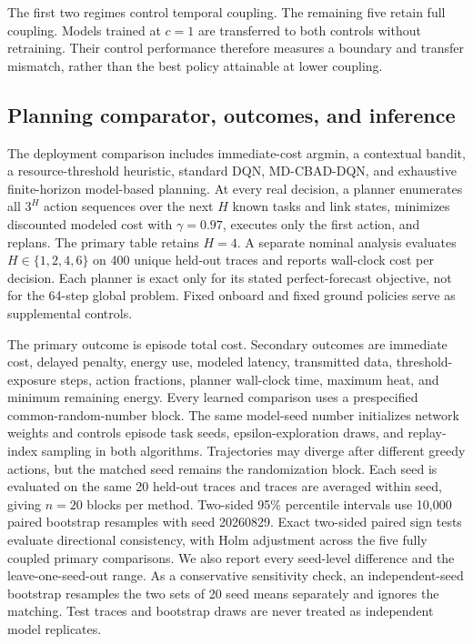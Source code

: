 \documentclass[11pt]{article}
\newcommand{\method}{MD-CBAD-DQN\xspace}
\begin{document}
The first two regimes control temporal coupling. The remaining five retain full coupling. Models trained at $c=1$ are transferred to both controls without retraining. Their control performance therefore measures a boundary and transfer mismatch, rather than the best policy attainable at lower coupling.

\subsection{Planning comparator, outcomes, and inference}

{\color{red}%
The deployment comparison includes immediate-cost argmin, a contextual bandit, a resource-threshold heuristic, standard DQN, \method, and exhaustive finite-horizon model-based planning. At every real decision, a planner enumerates all $3^H$ action sequences over the next $H$ known tasks and link states, minimizes discounted modeled cost with $\gamma=0.97$, executes only the first action, and replans. The primary table retains $H=4$. A separate nominal analysis evaluates $H\in\{1,2,4,6\}$ on 400 unique held-out traces and reports wall-clock cost per decision. Each planner is exact only for its stated perfect-forecast objective, not for the 64-step global problem. Fixed onboard and fixed ground policies serve as supplemental controls.
}%

{\color{red}%
The primary outcome is episode total cost. Secondary outcomes are immediate cost, delayed penalty, energy use, modeled latency, transmitted data, threshold-exposure steps, action fractions, planner wall-clock time, maximum heat, and minimum remaining energy. Every learned comparison uses a prespecified common-random-number block. The same model-seed number initializes network weights and controls episode task seeds, epsilon-exploration draws, and replay-index sampling in both algorithms. Trajectories may diverge after different greedy actions, but the matched seed remains the randomization block. Each seed is evaluated on the same 20 held-out traces and traces are averaged within seed, giving $n=20$ blocks per method. Two-sided 95\% percentile intervals use 10,000 paired bootstrap resamples with seed 20260829. Exact two-sided paired sign tests evaluate directional consistency, with Holm adjustment across the five fully coupled primary comparisons. We also report every seed-level difference and the leave-one-seed-out range. As a conservative sensitivity check, an independent-seed bootstrap resamples the two sets of 20 seed means separately and ignores the matching. Test traces and bootstrap draws are never treated as independent model replicates.
}%
\end{document}
